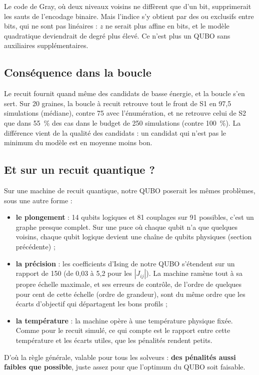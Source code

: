 \begin{piege}
Le code de Gray, où deux niveaux voisins ne diffèrent que d'un bit, supprimerait les sauts de l'encodage binaire. Mais l'indice s'y obtient par des \og ou exclusifs\fg{} entre bits, qui ne sont pas linéaires : $z$ ne serait plus affine en bits, et le modèle quadratique deviendrait de degré plus élevé. Ce n'est plus un QUBO sans auxiliaires supplémentaires.
\end{piege}

\subsection{Conséquence dans la boucle}
Le recuit fournit quand même des candidats de basse énergie, et la boucle s'en sert. Sur 20 graines, la boucle à recuit retrouve tout le front de S1 en 97,5 simulations (médiane), contre 75 avec l'énumération, et ne retrouve celui de S2 que dans 55~\% des cas dans le budget de 250 simulations (contre 100~\%). La différence vient de la qualité des candidats : un candidat qui n'est pas le minimum du modèle est en moyenne moins bon.

\subsection{Et sur un recuit quantique ?}
Sur une machine de recuit quantique, notre QUBO poserait les mêmes problèmes, sous une autre forme :
\begin{itemize}
\item \textbf{le plongement} : 14 qubits logiques et 81 couplages sur 91 possibles, c'est un graphe presque complet. Sur une puce où chaque qubit n'a que quelques voisins, chaque qubit logique devient une chaîne de qubits physiques (section précédente) ;
\item \textbf{la précision} : les coefficients d'Ising de notre QUBO s'étendent sur un rapport de 150 (de 0,03 à 5,2 pour les $|J_{ij}|$). La machine ramène tout à sa propre échelle maximale, et ses erreurs de contrôle, de l'ordre de quelques pour cent de cette échelle (ordre de grandeur), sont du même ordre que les écarts d'objectif qui départagent les bons profils ;
\item \textbf{la température} : la machine opère à une température physique fixée. Comme pour le recuit simulé, ce qui compte est le rapport entre cette température et les écarts utiles, que les pénalités rendent petits.
\end{itemize}
D'où la règle générale, valable pour tous les solveurs : \textbf{des pénalités aussi faibles que possible}, juste assez pour que l'optimum du QUBO soit faisable.


